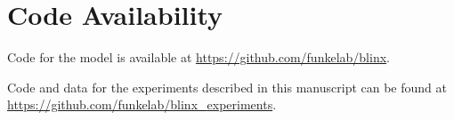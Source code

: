 \section{Code Availability}
Code for the model \ours is available at \href{https://github.com/funkelab/blinx}{https://github.com/funkelab/blinx}.

Code and data for the experiments described in this manuscript can be found at 
\href{https://github.com/funkelab/blinx{\_}experiments}{https://github.com/funkelab/blinx{\_}experiments}.
